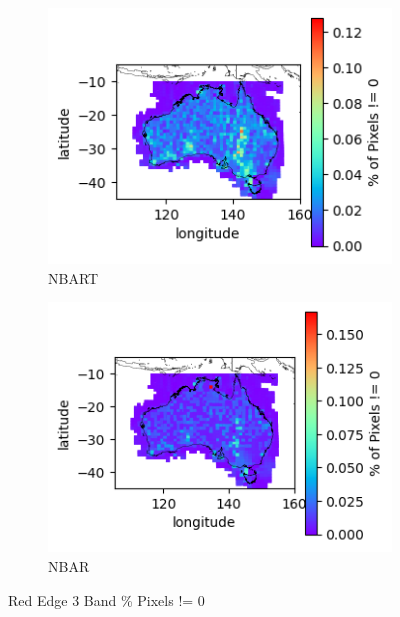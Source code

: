 \documentclass[a4paper]{article}
\begin{document}
      \begin{figure}[h!]
        \centering
          \begin{subfigure}[l]{.4\linewidth}
            \hspace{-32mm}
            \includegraphics[scale=0.9]{plots/nbart/nbart_red_edge_3-PercentDifferent.png}
            \caption{NBART}
          \end{subfigure}
%
          \begin{subfigure}[r]{.4\linewidth}
            \includegraphics[scale=0.9]{plots/nbar/nbar_red_edge_3-PercentDifferent.png}
            \caption{NBAR}
          \end{subfigure}
        \caption{Red Edge 3 Band \% Pixels != 0}\label{figure:29}
      \end{figure}
\end{document}

